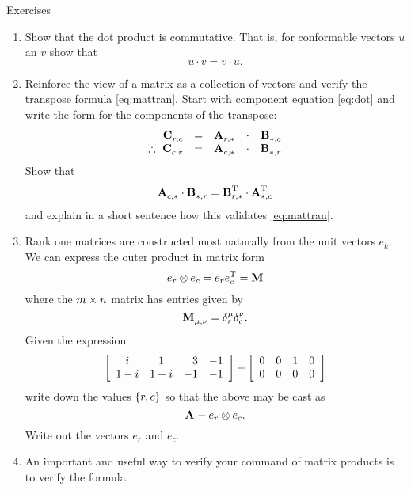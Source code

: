 \begin{xcb}{Exercises}
\begin{enumerate}
\item Show that the dot product is commutative. That is, for conformable vectors $u$ an $v$ show that
\begin{equation}
  u\cdot v=v \cdot u.
\end{equation}
\item Reinforce the view of a matrix as a collection of vectors and verify the transpose formula \eqref{eq:mattran}. Start with component equation \eqref{eq:dot} and write the form for the components of the transpose:
\begin{equation}
  \begin{array}{rcccc}
    \C{}_{r,c} &=& \A{}_{r,*}&\cdot&\B{}_{*,c} \\
    \therefore\ \C{}_{c,r} &=& \A{}_{c,*}&\cdot&\B{}_{*,r} \\
  \end{array}
\end{equation}
Show that
\begin{equation}
  \A{}_{c,*}\cdot\B{}_{*,r} = \B{T}_{r,*}\cdot\A{T}_{*,c}
\end{equation}
and explain in a short sentence how this validates \eqref{eq:mattran}.
\item Rank one matrices are constructed most naturally from the unit vectors $e_{k}$. We can express the outer product in matrix form
\begin{equation}
  e_{r}\otimes e_{c} = e_{r}e_{c}^{\mathrm{T}} = \M{}
\end{equation}
where the $\by{m}{n}$ matrix has entries given by
\begin{equation}
  \M{}_{\mu,\nu} = \delta_{r}^{\mu}\delta_{c}^{\nu}.
\end{equation}
\subitem Given the expression
\begin{equation}
  \mat{ccrr}
  {
  i & 1 & 3 & -1\\
  1-i & 1 + i & -1 & -1
  }
  -
  \mat{cccc}
  {
  0 & 0 & 1 & 0\\
  0 & 0 & 0 & 0
  }
\end{equation}
write down the values $\lst{r,c}$ so that the above may be cast as
\begin{equation}
  \A{} - e_{r}\otimes e_{c}.
\end{equation}
\subitem Write out the vectors $e_{r}$ and $e_{c}$.
\item An important and useful way to verify your command of 	matrix products is to verify the formula

\end{enumerate}
\end{xcb}
